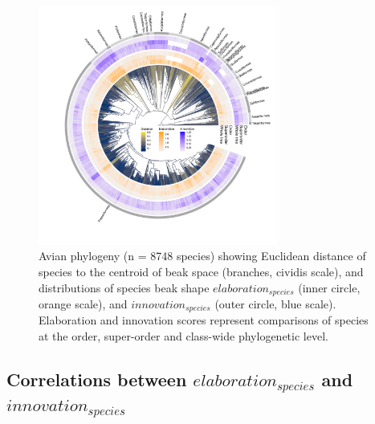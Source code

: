 \documentclass[12pt,a4paper]{article}
\begin{document}
\begin{figure}[H]
\centering
   \includegraphics[width=0.7\textwidth]{Figures/InnovElabTree_supp_revision.pdf}
\caption{Avian phylogeny (n = 8748 species) showing Euclidean distance of species to the centroid of beak space (branches, cividis scale), and distributions of species beak shape $elaboration_{species}$ (inner circle, orange scale), and $innovation_{species}$ (outer circle, blue scale). Elaboration and innovation scores represent comparisons of species at the order, super-order and class-wide phylogenetic level.}
\label{Fig:phylogeny_supplement}
\end{figure}



\subsection{Correlations between $elaboration_{species}$ and $innovation_{species}$}
\end{document}
